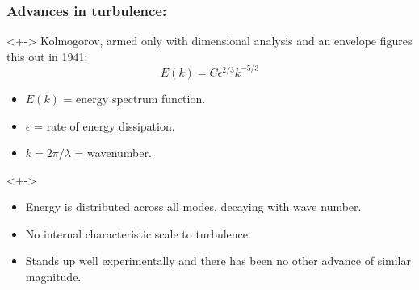 \begin{frame}
  \frametitle{Advances in turbulence:}
  
  \begin{block}<+->{
      Kolmogorov, armed only with dimensional analysis and an envelope
      figures this out in 1941:
    }
    $$
    E(k)
    =
    C
    \epsilon^{2/3}
    k^{-5/3}
    $$
    \begin{itemize}
    \item 
      $E(k)$ = energy spectrum function.
    \item 
      $\epsilon$ = rate of energy dissipation.
    \item
      $k = 2\pi/\lambda$ = wavenumber.
    \end{itemize}
  \end{block}

  \begin{block}<+->{}
    \begin{itemize}
    \item<+-> 
      Energy is distributed across all modes,
      decaying with wave number.
    \item<+-> 
      No internal characteristic scale to turbulence.
    \item<+-> 
      Stands up well experimentally and there has been no other advance of similar magnitude.
    \end{itemize}
  \end{block}

\end{frame}

